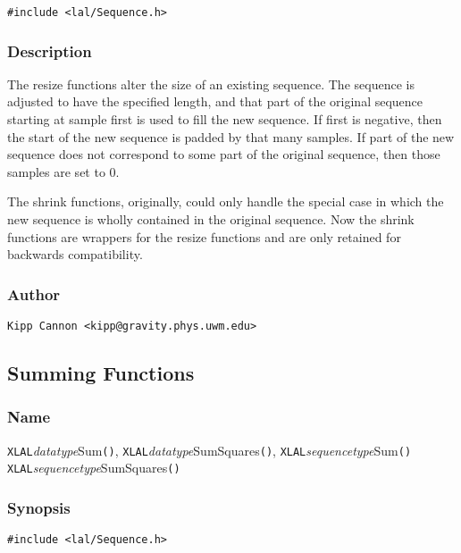 \begin{verbatim}
#include <lal/Sequence.h>
\end{verbatim}


\subsubsection{Description}

The resize functions alter the size of an existing sequence.  The sequence
is adjusted to have the specified length, and that part of the original
sequence starting at sample first is used to fill the new sequence.  If
first is negative, then the start of the new sequence is padded by that
many samples.  If part of the new sequence does not correspond to some part
of the original sequence, then those samples are set to 0.

The shrink functions, originally, could only handle the special case in
which the new sequence is wholly contained in the original sequence.  Now
the shrink functions are wrappers for the resize functions and are only
retained for backwards compatibility.

\subsubsection{Author}

\verb|Kipp Cannon <kipp@gravity.phys.uwm.edu>|


\subsection{Summing Functions}

\subsubsection{Name}

\texttt{XLAL}\textit{datatype}Sum\texttt{()},
\texttt{XLAL}\textit{datatype}SumSquares\texttt{()},
\texttt{XLAL}\textit{sequencetype}Sum\texttt{()}
\texttt{XLAL}\textit{sequencetype}SumSquares\texttt{()}

\subsubsection{Synopsis}

\begin{verbatim}
#include <lal/Sequence.h>
\end{verbatim}


